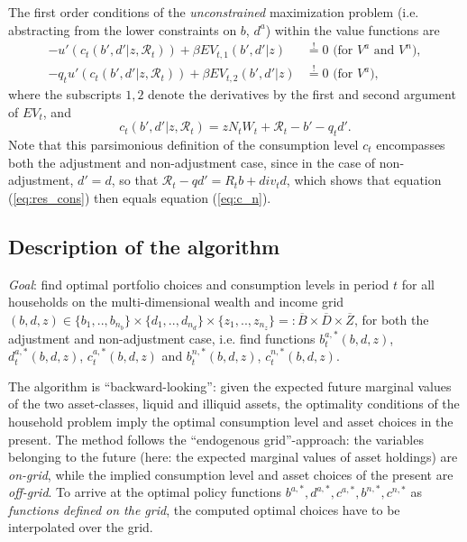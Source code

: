 \documentclass[11pt]{article} %
\begin{document}
The first order conditions of the \textit{unconstrained} maximization problem (i.e. abstracting from the lower constraints on $b$, $d^a$) within the value functions are
\begin{align}
- u'(c_t(b',d'|z,\mathcal{R}_t)) + \beta EV_{t,1}(b',d'|z) &\overset{!}{=} 0 \text{ (for }V^a\text{ and }V^n),\label{eq:Euler_b}\\
-q_t u'(c_t(b',d'|z,\mathcal{R}_t)) + \beta EV_{t,2}(b',d'|z) &\overset{!}{=}  0 \text{ (for }V^a), \label{eq:Euler_d}
\end{align}
where the subscripts $1,2$ denote the derivatives by the first and second argument of $EV_t$, and
\begin{equation}
c_t(b',d'|z,\mathcal{R}_t) = z N_t W_t + \mathcal{R}_t - b' - q_t d'. \label{eq:res_cons}
\end{equation}
Note that this parsimonious definition of the consumption level $c_t$ encompasses both the adjustment and non-adjustment case, since in the case of non-adjustment, $d' = d$, so that $\mathcal{R}_t - q d' = R_t b + div_t d$, which shows that equation (\ref{eq:res_cons}) then equals equation (\ref{eq:c_n}).

\subsection{Description of the algorithm}
\textit{Goal}: find optimal portfolio choices and consumption levels in period $t$ for all households on the multi-dimensional wealth and income grid $(b,d,z) \in \{b_1,..,b_{n_b}\} \times \{ d_1,..,d_{n_d} \} \times \{ z_1,..,z_{n_z} \} =: \overline{B} \times \overline{D} \times \overline{Z}$, for both the adjustment and non-adjustment case, i.e. find functions $b^{a,*}_t(b,d,z)$, $d^{a,*}_t(b,d,z)$, $c^{a,*}_t(b,d,z)$ and $b^{n,*}_t(b,d,z)$, $c^{n,*}_t(b,d,z)$.

The algorithm is ``backward-looking'': given the expected future marginal values of the two asset-classes, liquid and illiquid assets, the optimality conditions of the household problem imply the optimal consumption level and asset choices in the present. The method follows the ``endogenous grid''-approach: the variables belonging to the future (here: the expected marginal values of asset holdings) are \textit{on-grid}, while the implied consumption level and asset choices of the present are \textit{off-grid}. To arrive at the optimal policy functions $b^{a,*},d^{a,*},c^{a,*},b^{n,*},c^{n,*}$ as \textit{functions defined on the grid}, the computed optimal choices have to be interpolated over the grid.
\end{document}
